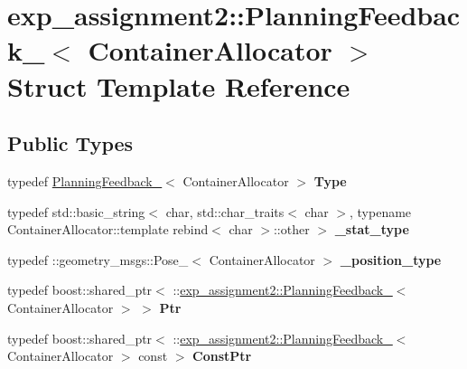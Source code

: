 \hypertarget{structexp__assignment2_1_1PlanningFeedback__}{}\section{exp\+\_\+assignment2\+:\+:Planning\+Feedback\+\_\+$<$ Container\+Allocator $>$ Struct Template Reference}
\label{structexp__assignment2_1_1PlanningFeedback__}
\subsection*{Public Types}
\begin{DoxyCompactItemize}
\item 
\mbox{\label{structexp__assignment2_1_1PlanningFeedback___a9ae2ce75447f8c09154da8f249c02d10}} 
typedef \hyperlink{structexp__assignment2_1_1PlanningFeedback__}{Planning\+Feedback\+\_\+}$<$ Container\+Allocator $>$ {\bfseries Type}
\item 
\mbox{\label{structexp__assignment2_1_1PlanningFeedback___a57cdd5b830d29389cad4486242c9a067}} 
typedef std\+::basic\+\_\+string$<$ char, std\+::char\+\_\+traits$<$ char $>$, typename Container\+Allocator\+::template rebind$<$ char $>$\+::other $>$ {\bfseries \+\_\+stat\+\_\+type}
\item 
\mbox{\label{structexp__assignment2_1_1PlanningFeedback___a89ca097d056409b0b64519376eb8c043}} 
typedef \+::geometry\+\_\+msgs\+::\+Pose\+\_\+$<$ Container\+Allocator $>$ {\bfseries \+\_\+position\+\_\+type}
\item 
\mbox{\label{structexp__assignment2_1_1PlanningFeedback___a3fb97adfb3c52d3570237a29f062eca8}} 
typedef boost\+::shared\+\_\+ptr$<$ \+::\hyperlink{structexp__assignment2_1_1PlanningFeedback__}{exp\+\_\+assignment2\+::\+Planning\+Feedback\+\_\+}$<$ Container\+Allocator $>$ $>$ {\bfseries Ptr}
\item 
\mbox{\label{structexp__assignment2_1_1PlanningFeedback___a1edadc72197d4417fba8db6eef8682d6}} 
typedef boost\+::shared\+\_\+ptr$<$ \+::\hyperlink{structexp__assignment2_1_1PlanningFeedback__}{exp\+\_\+assignment2\+::\+Planning\+Feedback\+\_\+}$<$ Container\+Allocator $>$ const  $>$ {\bfseries Const\+Ptr}
\end{DoxyCompactItemize}
